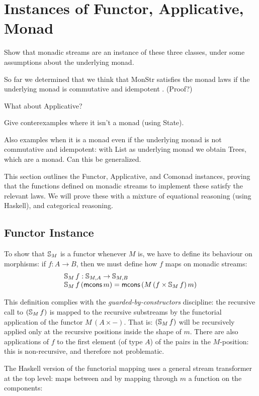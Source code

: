 \section{Instances of Functor, Applicative, Monad}

Show that monadic streams are an instance of these three classes, under some assumptions about the underlying monad.

So far we determined that we think that MonStr satisfies the monad laws if the underlying monad is commutative and idempotent \cite{idempotent_monads}. (Proof?)

What about Applicative?

Give conterexamples where it isn't a monad (using State).

Also examples when it is a monad even if the underlying monad is not commutative and idempotent: with List as underlying monad we obtain Trees, which are a monad. Can this be generalized.

This section outlines the Functor, Applicative, and Comonad instances, proving that the functions defined on monadic streams to implement these satisfy the relevant laws. We will prove these with a mixture of equational reasoning (using Haskell), and categorical reasoning.

\subsection{Functor Instance}

To show that $\mathbb{S}_{M}$ is a functor whenever $M$ is, we have to define its behaviour on morphisms: if $f:A\rightarrow B$, then we must define how $f$ maps on monadic streams:
$$
\begin{array}{l}
\mathbb{S}_{M}\,f : \mathbb{S}_{M,A} \rightarrow \mathbb{S}_{M,B}\\
\mathbb{S}_{M}\,f\,(\mathsf{mcons}\,m) = \mathsf{mcons}\,(M\,(f\times \mathbb{S}_{M}\,f)\,m)
\end{array}
$$

This definition complies with the {\em guarded-by-constructors} discipline: the recursive call to $(\mathbb{S}_{M}\,f)$ is mapped to the recursive substreams by the functorial application of the functor $M\,(A \times -)$.
That is: $(\mathbb{S}_{M}\,f)$ will be recursively applied only at the recursive positions inside the shape of $m$.
There are also applications of $f$ to the first element (of type $A$) of the pairs in the $M$-position: this is non-recursive, and therefore not problematic.

The Haskell version of the functorial mapping uses a general stream transformer at the top level:  maps between  and  by mapping through $m$ a function on the components:

